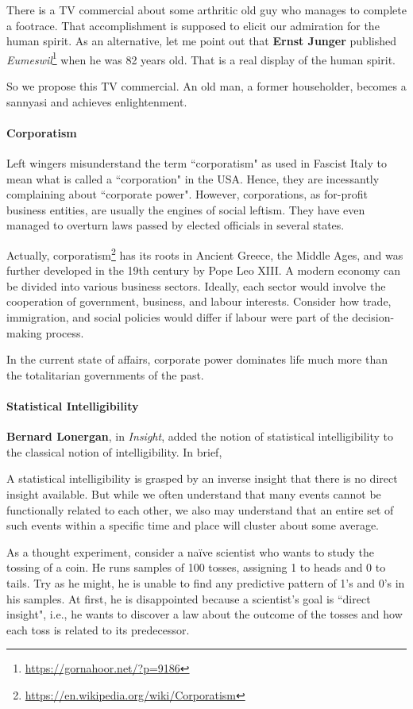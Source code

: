 There is a TV commercial about some arthritic old guy who manages to complete a footrace. That accomplishment is supposed to elicit our admiration for the human spirit. As an alternative, let me point out that \textbf{Ernst Junger} published \emph{Eumeswil}\footnote{\url{https://gornahoor.net/?p=9186}} when he was 82 years old. That is a real display of the human spirit.

So we propose this TV commercial. An old man, a former householder, becomes a sannyasi and achieves enlightenment.

\paragraph{Corporatism}
Left wingers misunderstand the term ``corporatism" as used in Fascist Italy to mean what is called a ``corporation" in the USA. Hence, they are incessantly complaining about ``corporate power". However, corporations, as for-profit business entities, are usually the engines of social leftism. They have even managed to overturn laws passed by elected officials in several states.

Actually, corporatism\footnote{\url{https://en.wikipedia.org/wiki/Corporatism}} has its roots in Ancient Greece, the Middle Ages, and was further developed in the 19th century by Pope Leo XIII. A modern economy can be divided into various business sectors. Ideally, each sector would involve the cooperation of government, business, and labour interests. Consider how trade, immigration, and social policies would differ if labour were part of the decision-making process.

In the current state of affairs, corporate power dominates life much more than the totalitarian governments of the past.

\paragraph{Statistical Intelligibility}
\textbf{Bernard Lonergan}, in \emph{Insight}, added the notion of statistical intelligibility to the classical notion of intelligibility. In brief,

\begin{quotex}
A statistical intelligibility is grasped by an inverse insight that there is no direct insight available. But while we often understand that many events cannot be functionally related to each other, we also may understand that an entire set of such events within a specific time and place will cluster about some average.

\end{quotex}
As a thought experiment, consider a naïve scientist who wants to study the tossing of a coin. He runs samples of 100 tosses, assigning 1 to heads and 0 to tails. Try as he might, he is unable to find any predictive pattern of 1's and 0's in his samples. At first, he is disappointed because a scientist's goal is ``direct insight", i.e., he wants to discover a law about the outcome of the tosses and how each toss is related to its predecessor.

